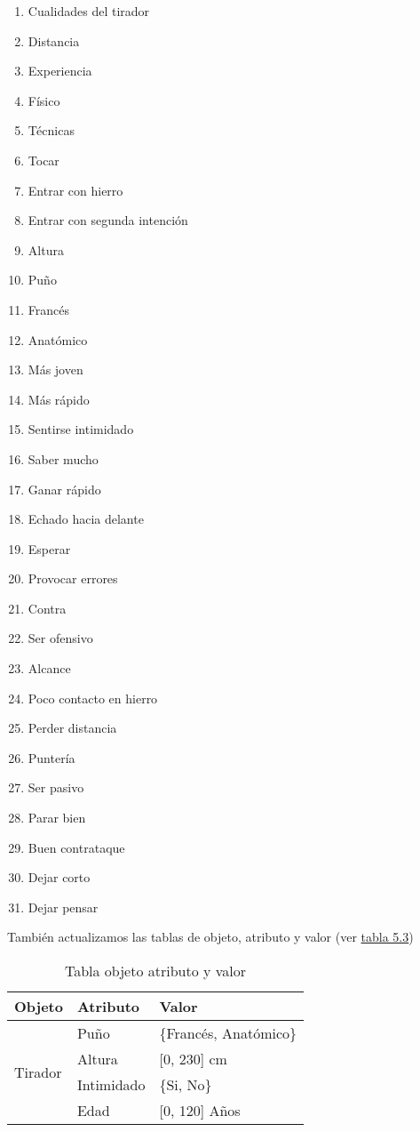 \begin{enumerate}

  \item Cualidades del tirador
  \item Distancia
  \item Experiencia
  \item Físico
  \item Técnicas
  \item Tocar
  \item Entrar con hierro
  \item Entrar con segunda intención
  \item Altura
  \item Puño
  \item Francés
  \item Anatómico
  \item Más joven
  \item Más rápido
  \item Sentirse intimidado
  \item Saber mucho
  \item Ganar rápido
  \item Echado hacia delante
  \item Esperar
  \item Provocar errores
  \item Contra
  \item Ser ofensivo
  \item Alcance
  \item Poco contacto en hierro
  \item Perder distancia
  \item Puntería
  \item Ser pasivo
  \item Parar bien
  \item Buen contrataque
  \item Dejar corto
  \item Dejar pensar

\end{enumerate}

También actualizamos las tablas de objeto, atributo y valor (ver \hyperref[tab:Tabla objeto atributo y valor]{tabla 5.3})

\begin{table}[]
  \centering
  \caption{Tabla objeto atributo y valor}
  \label{tab:Tabla objeto atributo y valor}
  \begin{tabular}{lll}
    Objeto & Atributo & Valor \\ \hline
    \multicolumn{1}{l|}{\multirow{4}{*}{Tirador}} & Puño & \{Francés, Anatómico\} \\ \cline{2-3}
    \multicolumn{1}{l|}{} & Altura & {[}0, 230{]} cm \\ \cline{2-3}
    \multicolumn{1}{l|}{} & Intimidado & \{Si, No\} \\ \cline{2-3}
    \multicolumn{1}{l|}{} & Edad & {[}0, 120{]} Años \\ \cline{2-3}
  \end{tabular}
\end{table}

